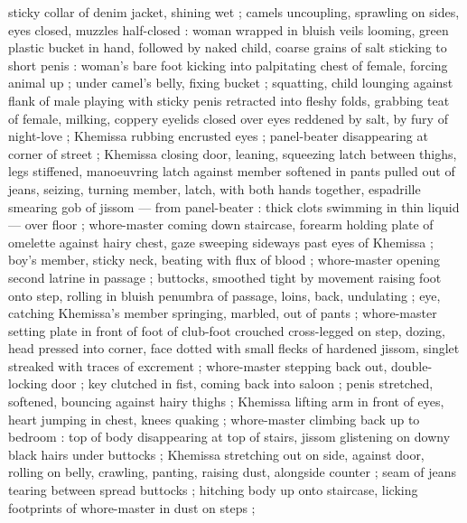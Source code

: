sticky collar of denim jacket, shining wet ; camels uncoupling, sprawling on sides, eyes closed, muzzles half-closed : woman wrapped in bluish veils looming, green plastic bucket in hand, followed by naked child, coarse grains of salt sticking to short penis : woman's bare foot kicking into palpitating chest of female, forcing animal up ; under camel's belly, fixing bucket ; squatting, child lounging against flank of male playing with sticky penis retracted into fleshy folds, grabbing teat of female, milking, coppery eyelids closed over eyes reddened by salt, by fury of night-love ; Khemissa rubbing encrusted eyes ; panel-beater disappearing at corner of street ; Khemissa closing door, leaning, squeezing latch between thighs, legs stiffened, manoeuvring latch against member softened in pants pulled out of jeans, seizing, turning member, latch, with both hands together, espadrille smearing gob of jissom --- from panel-beater : thick clots swimming in thin liquid --- over floor ; whore-master coming down staircase, forearm holding plate of omelette against hairy chest, gaze sweeping sideways past eyes of Khemissa ; boy's member, sticky neck, beating with flux of blood ; whore-master opening second latrine in passage ; buttocks, smoothed tight by movement raising foot onto step, rolling in bluish penumbra of passage, loins, back, undulating ; eye, catching Khemissa's member springing, marbled, out of pants ; whore-master setting plate in front of foot of club-foot crouched cross-legged on step, dozing, head pressed into corner, face dotted with small flecks of hardened jissom, singlet streaked with traces of excrement ; whore-master stepping back out, double-locking door ; key clutched in fist, coming back into saloon ; penis stretched, softened, bouncing against hairy thighs ; Khemissa lifting arm in front of eyes, heart jumping in chest, knees quaking ; whore-master climbing back up to bedroom : top of body disappearing at top of stairs, jissom glistening on downy black hairs under buttocks ; Khemissa stretching out on side, against door, rolling on belly, crawling, panting, raising dust, alongside counter ; seam of jeans tearing between spread buttocks ; hitching body up onto staircase, licking footprints of whore-master in dust on steps ;
